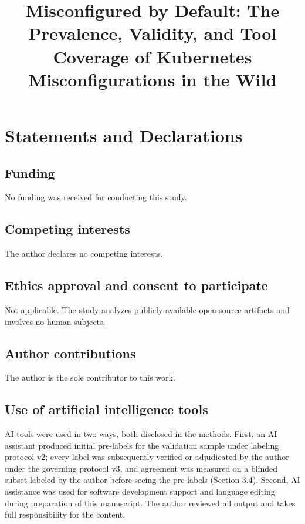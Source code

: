 \documentclass[pdflatex,sn-basic]{sn-jnl}
\title[Misconfigured by Default]{Misconfigured by Default: The Prevalence, Validity, and Tool Coverage of Kubernetes Misconfigurations in the Wild}
\author*[1]{\fnm{Girish} \sur{Mallya}}\email{girishm60@gmail.com}
\affil*[1]{\orgname{Independent Researcher}, \orgaddress{\city{Bellevue}, \state{WA}, \country{USA}}}
\begin{document}
\maketitle


\section*{Statements and Declarations}

\subsection*{Funding}
No funding was received for conducting this study.

\subsection*{Competing interests}
The author declares no competing interests.

\subsection*{Ethics approval and consent to participate}
Not applicable. The study analyzes publicly available open-source artifacts
and involves no human subjects.

\subsection*{Author contributions}
The author is the sole contributor to this work.

\subsection*{Use of artificial intelligence tools}
AI tools were used in two ways, both disclosed in the methods. First, an AI
assistant produced initial pre-labels for the validation sample under
labeling protocol v2; every label was subsequently verified or adjudicated
by the author under the governing protocol v3, and agreement was measured
on a blinded subset labeled by the author before seeing the pre-labels
(Section 3.4). Second, AI assistance was used for software development
support and language editing during preparation of this manuscript. The
author reviewed all output and takes full responsibility for the content.

\nocite{CISBenchmark,NSA2022,K8sPSS,ToolDocs}

\end{document}
